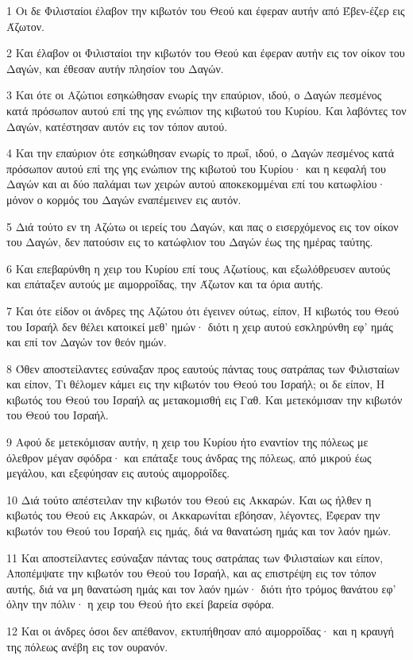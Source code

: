 \par 1 Οι δε Φιλισταίοι έλαβον την κιβωτόν του Θεού και έφεραν αυτήν από Έβεν-έζερ εις Άζωτον.
\par 2 Και έλαβον οι Φιλισταίοι την κιβωτόν του Θεού και έφεραν αυτήν εις τον οίκον του Δαγών, και έθεσαν αυτήν πλησίον του Δαγών.
\par 3 Και ότε οι Αζώτιοι εσηκώθησαν ενωρίς την επαύριον, ιδού, ο Δαγών πεσμένος κατά πρόσωπον αυτού επί της γης ενώπιον της κιβωτού του Κυρίου. Και λαβόντες τον Δαγών, κατέστησαν αυτόν εις τον τόπον αυτού.
\par 4 Και την επαύριον ότε εσηκώθησαν ενωρίς το πρωΐ, ιδού, ο Δαγών πεσμένος κατά πρόσωπον αυτού επί της γης ενώπιον της κιβωτού του Κυρίου· και η κεφαλή του Δαγών και αι δύο παλάμαι των χειρών αυτού αποκεκομμέναι επί του κατωφλίου· μόνον ο κορμός του Δαγών εναπέμεινεν εις αυτόν.
\par 5 Διά τούτο εν τη Αζώτω οι ιερείς του Δαγών, και πας ο εισερχόμενος εις τον οίκον του Δαγών, δεν πατούσιν εις το κατώφλιον του Δαγών έως της ημέρας ταύτης.
\par 6 Και επεβαρύνθη η χειρ του Κυρίου επί τους Αζωτίους, και εξωλόθρευσεν αυτούς και επάταξεν αυτούς με αιμορροΐδας, την Άζωτον και τα όρια αυτής.
\par 7 Και ότε είδον οι άνδρες της Αζώτου ότι έγεινεν ούτως, είπον, Η κιβωτός του Θεού του Ισραήλ δεν θέλει κατοικεί μεθ' ημών· διότι η χειρ αυτού εσκληρύνθη εφ' ημάς και επί τον Δαγών τον θεόν ημών.
\par 8 Όθεν αποστείλαντες εσύναξαν προς εαυτούς πάντας τους σατράπας των Φιλισταίων και είπον, Τι θέλομεν κάμει εις την κιβωτόν του Θεού του Ισραήλ; οι δε είπον, Η κιβωτός του Θεού του Ισραήλ ας μετακομισθή εις Γαθ. Και μετεκόμισαν την κιβωτόν του Θεού του Ισραήλ.
\par 9 Αφού δε μετεκόμισαν αυτήν, η χειρ του Κυρίου ήτο εναντίον της πόλεως με όλεθρον μέγαν σφόδρα· και επάταξε τους άνδρας της πόλεως, από μικρού έως μεγάλου, και εξεφύησαν εις αυτούς αιμορροΐδες.
\par 10 Διά τούτο απέστειλαν την κιβωτόν του Θεού εις Ακκαρών. Και ως ήλθεν η κιβωτός του Θεού εις Ακκαρών, οι Ακκαρωνίται εβόησαν, λέγοντες, Έφεραν την κιβωτόν του Θεού του Ισραήλ εις ημάς, διά να θανατώση ημάς και τον λαόν ημών.
\par 11 Και αποστείλαντες εσύναξαν πάντας τους σατράπας των Φιλισταίων και είπον, Αποπέμψατε την κιβωτόν του Θεού του Ισραήλ, και ας επιστρέψη εις τον τόπον αυτής, διά να μη θανατώση ημάς και τον λαόν ημών· διότι ήτο τρόμος θανάτου εφ' όλην την πόλιν· η χειρ του Θεού ήτο εκεί βαρεία σφόρα.
\par 12 Και οι άνδρες όσοι δεν απέθανον, εκτυπήθησαν από αιμορροΐδας· και η κραυγή της πόλεως ανέβη εις τον ουρανόν.

